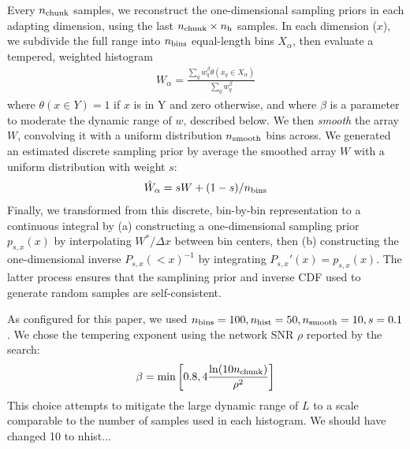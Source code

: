 \documentclass[twocolumn,prd,nofootinbib]{revtex4}
\newcommand\editremark[1]{{\color{red} #1}}
\begin{document}
Every $n_{\rm chunk}$ samples, we reconstruct the one-dimensional sampling priors in each adapting dimension, using
the last $n_{\rm chunk}\times n_{\rm h}$ samples.    In each dimension ($x$), we subdivide the full range
into $n_{\rm bins}$ equal-length bins $X_\alpha$, then evaluate a tempered, weighted histogram
\begin{eqnarray}
W_\alpha = \frac{\sum_{q} w_q^\beta \theta(x_q\in X_\alpha)}{\sum_q w_q^\beta}
\end{eqnarray}
where $\theta(x\in Y)=1$ if  $x$ is in Y and zero otherwise,  and where $\beta$ is a  parameter to moderate the dynamic
range of $w$, described below.  
%
We then \emph{smooth} the array $W$, convolving it with a uniform distribution $n_{\rm smooth}$ bins across.
%
We generated an estimated discrete sampling prior by average the smoothed array $W$ with a uniform distribution with weight $s$:
\begin{eqnarray}
\hat{W}_\alpha = s W + (1-s)/n_{\rm bins}
\end{eqnarray}
Finally, we transformed from this discrete, bin-by-bin representation to a continuous integral by (a) constructing
a one-dimensional sampling prior $p_{s,x}(x)$  by interpolating $W^*/\Delta x$ between bin centers, then (b) constructing the
one-dimensional inverse $P_{s,x}(<x)^{-1}$ by integrating $P_{s,x}'(x)=p_{s,x}(x)$.  
%
The latter process ensures that the samplining prior and inverse CDF used to generate random samples are
self-consistent.   
%


As configured for this paper, we used $n_{\rm bins}=100, n_{\rm hist}=50,n_{\rm smooth}=10,s=0.1$.  We chose the
tempering exponent using the network SNR $\rho$ reported by the search:
\begin{eqnarray}
\beta = \text{min} \left[ 0.8, 4 \frac{\ln (10 n_{\rm chunk})}{\rho^2} \right]
\end{eqnarray}
This choice attempts to mitigate the large dynamic range of $L$ to a scale comparable to the number of samples used in
each histogram.  
\editremark{We should have changed 10 to nhist...}






\end{document}
